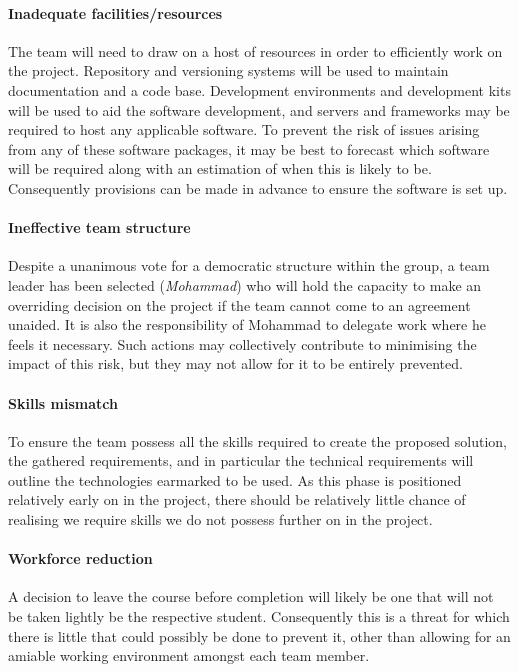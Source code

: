 \paragraph{Inadequate facilities/resources}
The team will need to draw on a host of resources in order to efficiently work on the project. Repository and versioning systems will be used to maintain documentation and a code base. Development environments and development kits will be used to aid the software development, and servers and frameworks may be required to host any applicable software. To prevent the risk of issues arising from any of these software packages, it may be best to forecast which software will be required along with an estimation of when this is likely to be. Consequently provisions can be made in advance to ensure the software is set up.

\paragraph{Ineffective team structure}
Despite a unanimous vote for a democratic structure within the group, a team leader has been selected (\emph{Mohammad}) who will hold the capacity to make an overriding decision on the project if the team cannot come to an agreement unaided. It is also the responsibility of Mohammad to delegate work where he feels it necessary. Such actions may collectively contribute to minimising the impact of this risk, but they may not allow for it to be entirely prevented.

\paragraph{Skills mismatch}
To ensure the team possess all the skills required to create the proposed solution, the gathered requirements, and in particular the technical requirements will outline the technologies earmarked to be used. As this phase is positioned relatively early on in the project, there should be relatively little chance of realising we require skills we do not possess further on in the project.

\paragraph{Workforce reduction}
A decision to leave the course before completion will likely be one that will not be taken lightly be the respective student. Consequently this is a threat for which there is little that could possibly be done to prevent it, other than allowing for an amiable working environment amongst each team member.

